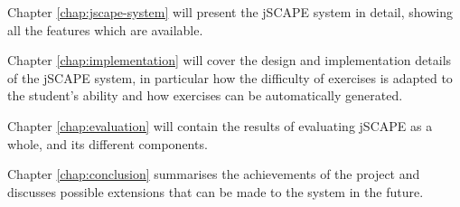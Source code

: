 Chapter \ref{chap:jscape-system} will present the jSCAPE system in detail, showing all the features which are available.\newline

Chapter \ref{chap:implementation} will cover the design and implementation details of the jSCAPE system, in particular how the difficulty of exercises is adapted to the student's ability and how exercises can be automatically generated.\newline

Chapter \ref{chap:evaluation} will contain the results of evaluating jSCAPE as a whole, and its different components. \newline

Chapter \ref{chap:conclusion} summarises the achievements of the project and discusses possible extensions that can be made to the system in the future.
